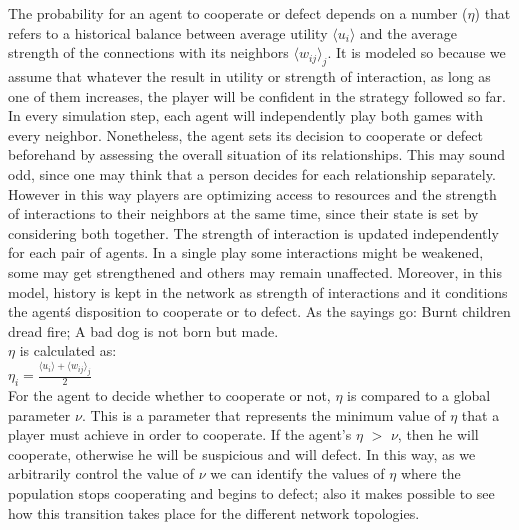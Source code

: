 \documentclass{bmcart}
\begin{document}
The probability for an agent to cooperate or defect depends on a number ($\eta$)
that refers to a historical balance between average utility $\langle u_i \rangle$ and the average
strength of the connections with its neighbors $\langle w_{ij} \rangle _j$. It is modeled so because we
assume that whatever the result in utility or strength of interaction, as long
as one of them increases, the player will be confident in the strategy followed
so far. {\color{red}In every simulation step, each agent will independently play both games
with every neighbor. Nonetheless, the agent sets its decision to cooperate or
defect beforehand by assessing the overall situation of its relationships. This
may sound odd, since one may think that a person decides for each relationship
separately. However in this way players are optimizing access to resources and
the strength of interactions to their neighbors at the same time, since their
state is set by considering both together. The strength of interaction is
updated independently for each pair of agents.  In a single play some
interactions might be weakened, some may get strengthened and others may remain
unaffected. Moreover, in this model, history is kept in the network as strength
of interactions and it conditions the agent\'s disposition to cooperate or to
defect. As the sayings go: Burnt children dread fire; A bad dog is not born but made.}\\


$\eta$ is calculated as:\\ 


$\eta_i = \frac{\langle u_i \rangle + \langle w_{ij} \rangle _j}{2}$\\

For the agent to decide whether to cooperate or not, $\eta$ is compared to a
global parameter $\nu$. This is a parameter that represents the minimum value of
$\eta$ that a player must achieve in order to cooperate. If the agent's
$\eta$ $>$ $\nu$, then he will cooperate, otherwise he will be suspicious and
will defect. In this way, as we arbitrarily control the value of $\nu$ we can
identify the values of $\eta$ where the population stops cooperating and begins
to defect; also it makes possible to see how this transition takes place for the
different network topologies.  \\


\end{document}
